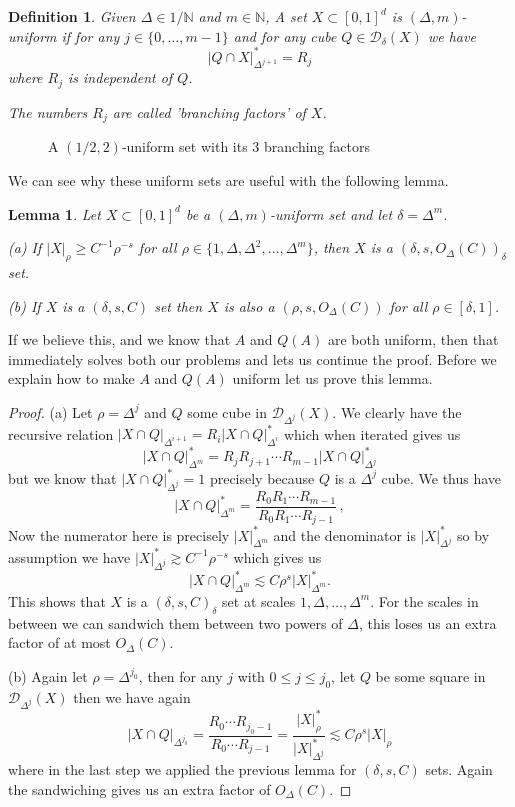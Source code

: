 \documentclass[12pt]{amsart}
\newtheorem{lemma}[theorem]{Lemma}
\newtheorem{Definition}[theorem]{Definition}
\begin{document}
\begin{Definition}
    Given $\Delta \in 1/\mathbb{N}$ and $m \in \mathbb{N}$, A set $X \subset [0,1]^d$ is $(\Delta, m)$-uniform if for any $j \in \{0,\dots,m-1\}$ and for any cube $Q \in \mathcal{D}_\delta (X)$ we have
    $$
      |Q \cap X|^*_{\Delta^{j+1}} = R_j
    $$
    where $R_j$ is independent of $Q$.

    The numbers $R_j$ are called 'branching factors' of $X$.
\end{Definition}

\begin{figure}[h]
    \centering
    
    \caption{A $(1/2, 2)$-uniform set with its 3 branching factors}
    \label{fig:uniform-set}
\end{figure}

We can see why these uniform sets are useful with the following lemma.
\begin{lemma}
    Let $X \subset [0,1]^d$ be a $(\Delta, m)$-uniform set and let $\delta = \Delta^m$.

    (a) If $|X|_\rho \geq C^{-1} \rho^{-s}$ for all $\rho \in \{1, \Delta, \Delta^2, \dots, \Delta^m\}$, then $X$ is a $(\delta, s,O_\Delta (C))_\delta$ set.

    (b) If $X$ is a $(\delta,s,C)$ set then $X$ is also a $(\rho, s, O_\Delta (C))$ for all $\rho \in [\delta, 1]$.
\end{lemma}
If we believe this, and we know that $A$ and $Q(A)$ are both uniform, then that immediately solves both our problems and lets us continue the proof. Before we explain how to make $A$ and $Q(A)$ uniform let us prove this lemma.
\begin{proof}
    (a) Let $\rho = \Delta^j$ and $Q$ some cube in $\mathcal{D}_{\Delta^j} (X)$. We clearly have the recursive relation $|X \cap Q|_{\Delta^{i+1}} = R_{i} |X \cap Q|_{\Delta^{i}}^*$ which when iterated gives us
    $$
        |X \cap Q|_{\Delta^m}^* = R_{j} R_{j+1} \cdots R_{m-1} |X \cap Q|_{\Delta^j}^*
    $$
    but we know that $|X \cap Q|_{\Delta^j}^* = 1$ precisely because $Q$ is a $\Delta^j$ cube. We thus have
    $$
    |X \cap Q|_{\Delta^m}^* = \frac{R_{0} R_{1} \cdots R_{m-1} }{R_{0} R_{1} \cdots R_{j-1}}\, ,
    $$
    Now the numerator here is precisely $|X|^*_{\Delta^m}$ and the denominator is $|X|^*_{\Delta^j}$ so by assumption we have $|X|^*_{\Delta^j} \gtrsim C^{-1} \rho^{-s}$ which gives us 
    $$
    |X \cap Q|_{\Delta^m}^* \lesssim C \rho^{s} |X|^*_{\Delta^m}.
    $$
    This shows that $X$ is a $(\delta,s,C)_\delta$ set at scales $1,\Delta,\dots,\Delta^m$. For the scales in between we can sandwich them between two powers of $\Delta$, this loses us an extra factor of at most $O_\Delta (C)$.

    (b) Again let $\rho = \Delta^{j_0}$, then for any $j$ with $0 \leq j \leq j_0$, let $Q$ be some square in $\mathcal{D}_{\Delta^j} (X)$ then we have again
    $$
        |X \cap Q|_{\Delta^{j_0}} = \frac{R_0 \cdots R_{j_0 - 1}}{R_0 \cdots R_{j-1}} = \frac{|X|^*_{\rho}}{|X|^*_{\Delta^j}}
        \lesssim C \rho^s |X|_\rho
    $$
    where in the last step we applied the previous lemma for $(\delta, s, C)$ sets.
    Again the sandwiching gives us an extra factor of $O_\Delta (C)$.
\end{proof}
\end{document}

